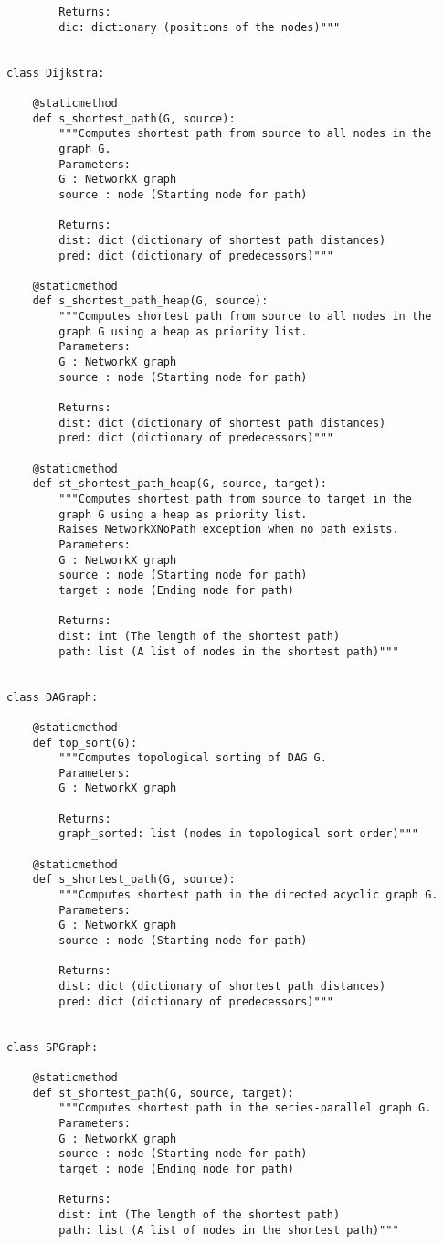 \documentclass[]{article}
\numberwithin{equation}{section}
\begin{document}
\begin{appendices}
\begin{lstlisting}
		Returns:
		dic: dictionary (positions of the nodes)"""


class Dijkstra:

	@staticmethod
	def s_shortest_path(G, source):
		"""Computes shortest path from source to all nodes in the
		graph G.
		Parameters:
		G : NetworkX graph
		source : node (Starting node for path)
		
		Returns:
		dist: dict (dictionary of shortest path distances)
		pred: dict (dictionary of predecessors)"""
	
	@staticmethod
	def s_shortest_path_heap(G, source):
		"""Computes shortest path from source to all nodes in the
		graph G using a heap as priority list.
		Parameters:
		G : NetworkX graph
		source : node (Starting node for path)
		
		Returns:
		dist: dict (dictionary of shortest path distances)
		pred: dict (dictionary of predecessors)"""
	
	@staticmethod
	def st_shortest_path_heap(G, source, target):
		"""Computes shortest path from source to target in the
		graph G using a heap as priority list.
		Raises NetworkXNoPath exception when no path exists.
		Parameters:
		G : NetworkX graph
		source : node (Starting node for path)
		target : node (Ending node for path)
		
		Returns:
		dist: int (The length of the shortest path)
		path: list (A list of nodes in the shortest path)"""

	
class DAGraph:
	
	@staticmethod
	def top_sort(G):
		"""Computes topological sorting of DAG G.
		Parameters:
		G : NetworkX graph
		
		Returns:
		graph_sorted: list (nodes in topological sort order)"""
	
	@staticmethod
	def s_shortest_path(G, source):
		"""Computes shortest path in the directed acyclic graph G.
		Parameters:
		G : NetworkX graph
		source : node (Starting node for path)
		
		Returns:
		dist: dict (dictionary of shortest path distances)
		pred: dict (dictionary of predecessors)"""
	
	
class SPGraph:
	
	@staticmethod
	def st_shortest_path(G, source, target):
		"""Computes shortest path in the series-parallel graph G.
		Parameters:
		G : NetworkX graph
		source : node (Starting node for path)
		target : node (Ending node for path)
		
		Returns:
		dist: int (The length of the shortest path)
		path: list (A list of nodes in the shortest path)"""
\end{lstlisting}


\end{appendices}
\end{document}
